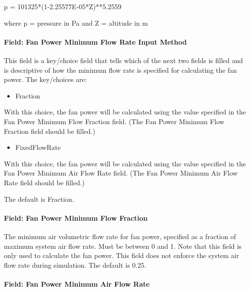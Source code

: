 p = 101325*(1-2.25577E-05*Z)**5.2559

where p = pressure in Pa and Z = altitude in m

\paragraph{Field: Fan Power Minimum Flow Rate Input Method}\label{field-fan-power-minimum-flow-rate-input-method}

This field is a key/choice field that tells which of the next two fields is filled and is descriptive of how the minimum flow rate is specified for calculating the fan power. The key/choices are:

\begin{itemize}
\tightlist
\item
  Fraction
\end{itemize}

With this choice, the fan power will be calculated using the value specified in the Fan Power Minimum Flow Fraction field. (The Fan Power Minimum Flow Fraction field should be filled.)

\begin{itemize}
\tightlist
\item
  FixedFlowRate
\end{itemize}

With this choice, the fan power will be calculated using the value specified in the Fan Power Minimum Air Flow Rate field. (The Fan Power Minimum Air Flow Rate field should be filled.)

The default is Fraction.

\paragraph{Field: Fan Power Minimum Flow Fraction}\label{field-fan-power-minimum-flow-fraction}

The minimum air volumetric flow rate for fan power, specified as a fraction of maximum system air flow rate. Must be between 0 and 1. Note that this field is only used to calculate the fan power. This field does not enforce the system air flow rate during simulation. The default is 0.25.

\paragraph{Field: Fan Power Minimum Air Flow Rate}\label{field-fan-power-minimum-air-flow-rate}

